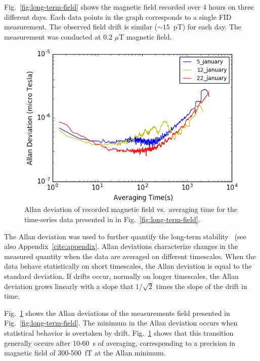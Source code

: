 Fig.~\ref{fig:long-term-field} shows the magnetic field recorded over
4 hours on three different days. Each data points in the graph
corresponds to a single FID measurement.  The observed field drift is
similar ($\sim 15$~pT) for each day.  The measurement was conducted at
0.2 $\mu$T magnetic field.

\begin{figure}%
\centering\includegraphics[width=0.8\linewidth]{figures/field_3_day_allan.png}
\caption{Allan deviation of recorded magnetic field vs.~averaging time
  for the time-series data presented in in
  Fig.~\ref{fig:long-term-field}.\label{fig:allan_deviation}}
\end{figure}

The Allan deviation was used to further quantify the long-term
stability~\cite{doe:website2} (see also Appendix~\ref{cite:appendix}.
Allan deviations characterize changes in the measured quantity when
the data are averaged on different timescales.  When the data behave
statistically on short timescales, the Allan deviation is equal to the
standard deviation.  If drifts occur, normally on longer timescales,
the Allan deviation grows linearly with a slope that $1/\sqrt{2}$
times the slope of the drift in time.

Fig.~\ref{fig:allan_deviation} shows the Allan deviations of the
measurements field presented in Fig.~\ref{fig:long-term-field}.  The
minimum in the Allan deviation occurs when statistical behavior is
overtaken by drift.  Fig.~\ref{fig:allan_deviation} shows that this
transition generally occurs after 10-60~s of averaging, corresponding
to a precision in magnetic field of 300-500~fT at the Allan minimum.

